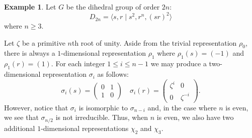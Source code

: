 \documentclass[12pt]{article}
\theoremstyle{plain}
\theoremstyle{definition}
\newtheorem{example}[theorem]{Example}
\theoremstyle{remark}
\numberwithin{equation}{section}
\begin{document}
\begin{example}
Let $G$ be the dihedral group of order $2n$:
\[
D_{2n} = \langle s,r \mid s^2, r^n, (sr)^2 \rangle
\]
where $n \ge 3$.

Let $\zeta$ be a primitive $n$th root of unity.
Aside from the trivial representation $\rho_0$,
there is always a $1$-dimensional representation $\rho_1$
where $\rho_1(s)=(-1)$ and $\rho_1(r)=(1)$.
For each integer $1 \le i \le n-1$ we may produce a two-dimensional
representation $\sigma_i$ as follows:
\[
\sigma_i(s) = \begin{pmatrix} 0&1\\1&0 \end{pmatrix} \quad
\sigma_i(r) = \begin{pmatrix} \zeta^i&0\\0&\zeta^{-i} \end{pmatrix} .
\]
However, notice that $\sigma_i$ is isomorphic to $\sigma_{n-i}$
and, in the case where $n$ is even, we see that $\sigma_{n/2}$ is not
irreducible.
Thus, when $n$ is even, we also have two additional
$1$-dimensional representations
$\chi_2$ and $\chi_3$.


\end{example}
\end{document}
